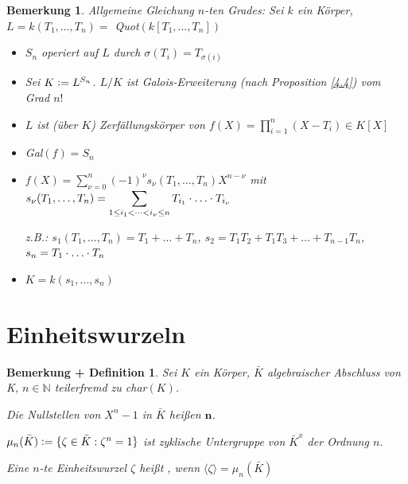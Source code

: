 \documentclass[a4paper,10pt,german]{scrbook}
\theoremstyle{saetze}
\theoremstyle{definitionen}
\newtheorem{Bem}[Def]{Bemerkung}
\newtheorem{BemDef}[Def]{Bemerkung + Definition}
\begin{document}
\begin{Bem}
Allgemeine Gleichung $n$-ten Grades: Sei $k$
ein Körper, $L = k(T_1,\dots,T_n) =$ Quot$(k[T_1,\dots,T_n])$

\begin{itemize}
\item $S_n$ operiert auf $L$ durch $\sigma(T_i) = T_{\sigma(i)}$

\item Sei $K\mathrel{\mathop:}= L^{S_n}$. $L/K$ ist Galois-Erweiterung (nach
Proposition \ref{4.4}) vom Grad $n!$

\item $L$ ist (über $K$) Zerfällungskörper von $f(X) =
\displaystyle \prod_{i=1}^n(X-T_i) \in K[X]$

\item Gal$(f) = S_n$

\item $f(X) = \displaystyle \sum_{\nu = 0}^n (-1)^{\nu} s_{\nu}
(T_1,\dots,T_n)X^{n-\nu}$ mit $s_{\nu}(T_1,\dots,T_n) =
\displaystyle \sum_{1\leq i_1 < \dots < i_{\nu} \leq n} T_{i_1} \cd \dots \cd 
T_{i_\nu}$

z.B.: $s_1(T_1,\dots,T_n) = T_1 + \dots + T_n$, $s_2 = T_1 T_2 + T_1
T_3 + \dots + T_{n-1}T_n$, $s_n = T_1 \cd \dots \cd T_n$

\item $K = k(s_1,\dots,s_n)$
\end{itemize}
\end{Bem}
\section{Einheitswurzeln}

\begin{BemDef}
\label{4.8}
Sei $K$ ein Körper, $\bar K$
algebraischer Abschluss von K, $n \in\mathbb{N}$ teilerfremd zu char$(K)$.

\begin{enum}
\item Die Nullstellen von $X^n - 1$ in $\bar K$ heißen
$\mathbf{n}$.

\item $\mu_n(\bar K) \mathrel{\mathop:}= \{\zeta \in \bar K: \zeta^n = 1\}$ ist
zyklische Untergruppe von ${\bar K}^x$ der Ordnung $n$.


\item Eine $n$-te Einheitswurzel $\zeta$ heißt , wenn
$\langle \zeta \rangle = \mu_n(\bar K)$
\end{enum}
\end{BemDef}
\end{document}
